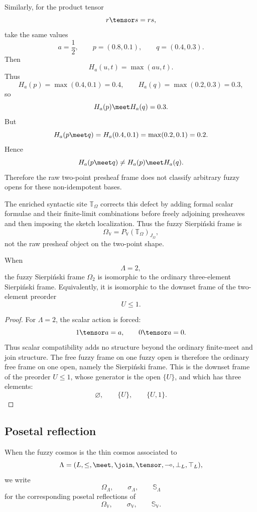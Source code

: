 Similarly, for the product tensor
\[
    r\tensor s=rs,
\]
take the same values
\[
    a=\frac12,
    \qquad
    p=(0.8,0.1),
    \qquad
    q=(0.4,0.3).
\]
Then
\[
    H_a(u,t)=\max(au,t).
\]
Thus
\[
    H_a(p)=\max(0.4,0.1)=0.4,
    \qquad
    H_a(q)=\max(0.2,0.3)=0.3,
\]
so
\[
    H_a(p)\meet H_a(q)=0.3.
\]
But
\[
    H_a(p\meet q)
    =
    H_a(0.4,0.1)
    =
    \max(0.2,0.1)
    =
    0.2.
\]
Hence
\[
    H_a(p\meet q)\neq H_a(p)\meet H_a(q).
\]
Therefore the raw two-point presheaf frame does not classify arbitrary fuzzy opens
for these non-idempotent bases.

The enriched syntactic site \(\mathbb T_{\Omega}\) corrects this defect by adding
formal scalar formulae and their finite-limit combinations before freely adjoining
presheaves and then imposing the sketch localization. Thus the fuzzy Sierpiński
frame is
\[
    \Omega_{\mathbb V}
    =
    P_{\mathbb V}(\mathbb T_{\Omega})_{J_{\Omega}},
\]
not the raw presheaf object on the two-point shape.

\begin{corollary}
\label{cor:crisp-sierpinski-specialization}
When
\[
    \Lambda=2,
\]
the fuzzy Sierpiński frame \(\Omega_2\) is isomorphic to the ordinary three-element
Sierpiński frame. Equivalently, it is isomorphic to the downset frame of the
two-element preorder
\[
    U\leq 1.
\]
\end{corollary}

\begin{proof}
For \(\Lambda=2\), the scalar action is forced:
\[
    1\tensor a=a,
    \qquad
    0\tensor a=0.
\]
Thus scalar compatibility adds no structure beyond the ordinary finite-meet and
join structure. The free fuzzy frame on one fuzzy open is therefore the ordinary
free frame on one open, namely the Sierpiński frame. This is the downset frame of
the preorder \(U\leq 1\), whose generator is the open \(\{U\}\), and which has three
elements:
\[
    \varnothing,
    \qquad
    \{U\},
    \qquad
    \{U,1\}.
\]
\end{proof}

\subsection{Posetal reflection}
\label{subsec:sierpinski-posetal-reflection}

When the fuzzy cosmos is the thin cosmos associated to
\[
    \Lambda=(L,\leq,\meet,\join,\tensor,\multimap,\bot_L,\top_L),
\]
we write
\[
    \Omega_\Lambda,
    \qquad
    \sigma_\Lambda,
    \qquad
    \mathbb S_\Lambda
\]
for the corresponding posetal reflections of
\[
    \Omega_{\mathbb V},
    \qquad
    \sigma_{\mathbb V},
    \qquad
    \mathbb S_{\mathbb V}.
\]

